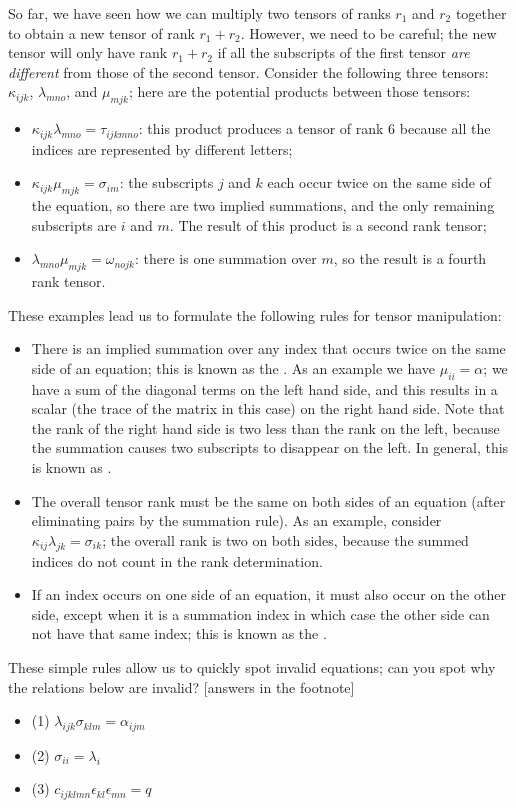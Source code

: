 So far, we have seen how we can multiply two tensors of ranks $r_1$ and $r_2$ together to obtain a new tensor of rank $r_1+r_2$.  However, we need to be careful; the new tensor will only have rank $r_1+r_2$ if all the subscripts of the first tensor \textit{are different} from those of the second tensor.  Consider the following three tensors: $\kappa_{ijk}$, $\lambda_{mno}$, and $\mu_{mjk}$; here are the potential products between those tensors:
\begin{itemize}
\item $\kappa_{ijk}\lambda_{mno} = \tau_{ijkmno}$: this product produces a tensor of rank $6$ because all the indices are represented by different letters;
\item $\kappa_{ijk}\mu_{mjk} = \sigma_{im}$: the subscripts $j$ and $k$ each occur twice on the same side of the equation, so there are two implied summations, and the only remaining subscripts are $i$ and $m$.  The result of this product is a second rank tensor;
\item $\lambda_{mno}\mu_{mjk}=\omega_{nojk}$: there is one summation over $m$, so the result is a fourth rank tensor.\\
\end{itemize}

\noindent These examples lead us to formulate the following rules for tensor manipulation:
\begin{itemize}
	\item There is an implied summation over any index that occurs twice on the same side of an equation; this is known as the .  As an example we have $\mu_{ii}=\alpha$; we have a sum of the diagonal terms on the left hand side, and this results in a scalar (the trace of the matrix in this case) on the right hand side.  Note that the rank of the right hand side is two less than the rank on the left, because the summation causes two subscripts to disappear on the left.  In general, this is known as .
	\item The overall tensor rank must be the same on both sides of an equation (after eliminating pairs by the summation rule).  As an example, consider $\kappa_{ij}\lambda_{jk}=\sigma_{ik}$; the overall rank is two on both sides, because the summed indices do not count in the rank determination.
	\item If an index occurs on one side of an equation, it must also occur on the other side, except when it is a summation index in which case the other side can not have that same index; this is known as the .
\end{itemize}
These simple rules allow us to quickly spot invalid equations; can you spot why the relations below are invalid? [answers in the footnote\footnotemark{}]
\begin{itemize}
\item (1) $\lambda_{ijk}\sigma_{klm} = \alpha_{ijm}$
\item (2) $\sigma_{ii} = \lambda_i$ 
\item (3) $c_{ijklmn}\epsilon_{kl}\epsilon_{mn} = q$
\end{itemize}

